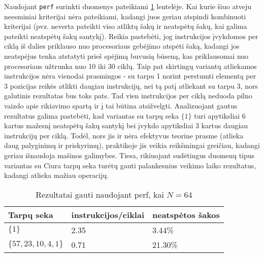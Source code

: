 \documentclass{VUMIFInfBakalaurinis}
\begin{document}
Naudojant \verb|perf| surinkti duomenys pateikiami \ref{perf_results_64} lentelėje.
Kai kurie šiuo atveju neesminiai kriterijai nėra pateikiami, kadangi juos geriau atspindi kombinuoti kriterijai
(pvz. neverta pateikti viso atliktų šakų ir neatspėtų šakų, kai galima pateikti neatspėtų šakų santykį).
Reikia pastebėti, jog instrukcijos įvykdomos per ciklą iš dalies priklauso nuo procesoriaus gebėjimo atspėti šaką, kadangi jos neatspėjus tenka atstatyti prieš spėjimą buvusią būseną,
kas priklausomai nuo procesoriaus užtrunka nuo 10 iki 30 ciklų.
Taip pat skirtingų variantų atliekamos instrukcijos nėra vienodai prasmingos - su tarpu 1 norint perstumti elementą per 3 pozicijas reikės atlikti daugiau instrukcijų,
nei tą patį atliekant su tarpu 3, nors galutinis rezultatas bus toks pats.
Tad vien instrukcijos per ciklą neduoda pilno vaizdo apie rikiavimo spartą ir į tai būtina atsižvelgti.
Analizuojant gautus rezultatus galima pastebėti, kad variantas su tarpų seka $\{1\}$ turi apytiksliai 6 kartus mažesnį neatspėtų šakų santykį bei įvykdo apytiksliai 3 kartus daugiau instrukcijų per ciklą.
Todėl, nors jis ir nėra efektyvus teorine prasme (atlieka daug palyginimų ir priskyrimų), praktikoje jis veikia reikšmingai greičiau, kadangi geriau išnaudoja mašinos galimybes.
Tiesa, rikiuojant sudėtingus duomenų tipus variantas su Ciura tarpų seka turėtų gauti palankesnius veikimo laiko rezultatus, kadangi atlieka mažiau operacijų.

\begin{table}[H]
  \caption{Rezultatai gauti naudojant perf, kai $N = 64$}
  \label{perf_results_64}
  \centering
  \begin{tabular}{@{}lll@{}}
  Tarpų seka            & instrukcijos/ciklai     & neatspėtos šakos \\ \midrule
  $\{1\}$               & 2.35                    & 3.44\%           \\
  $\{57,23,10,4,1\}$    & 0.71                    & 21.30\%          \\ \bottomrule
  \end{tabular}
\end{table}

\pagebreak
\end{document}
